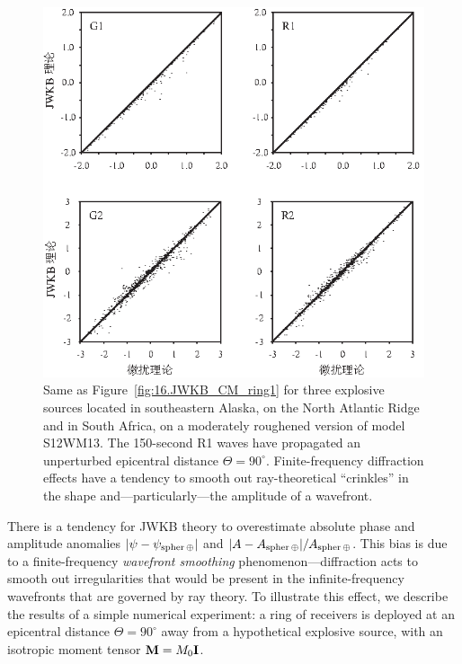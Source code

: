 \begin{figure}[!b]
\begin{center}
\includegraphics{../figures/chap16/fig13.eps}
\end{center}
\caption[JWKB_CM_ring2]{\label{fig:16.JWKB_CM_ring2}
Same as Figure~\protect\ref{fig:16.JWKB_CM_ring1}
for three explosive sources located in southeastern Alaska,
on the North Atlantic Ridge and in South Africa, on a
moderately roughened version of model S12WM13.
The 150-second R1 waves have propagated an unperturbed
epicentral distance $\Theta=90^{\circ}$.  Finite-frequency
diffraction effects have a tendency to smooth out
ray-theoretical ``crinkles'' in the shape
and---particularly---the amplitude of a wavefront.}
\end{figure}
There is a tendency for JWKB theory to
overestimate absolute phase and amplitude anomalies
$|\psi-\psi_{\rm spher\,\oplus}|$ and
$|A-A_{\rm spher\,\oplus}|/A_{\rm spher\,\oplus}$.
This bias is due to a finite-frequency {\em wavefront smoothing\/}
%
phenomenon---diffraction acts to smooth out irregularities
that would be present in the infinite-frequency
wavefronts that are governed by ray theory.
To illustrate this effect, we describe the results of a
simple numerical experiment: a ring of
receivers is deployed at an epicentral
distance $\Theta=90^\circ$ away from a hypothetical
explosive source, with an isotropic moment tensor $\mbox{${\bf M}$}=M_0\mbox{${\bf I}$}$.
